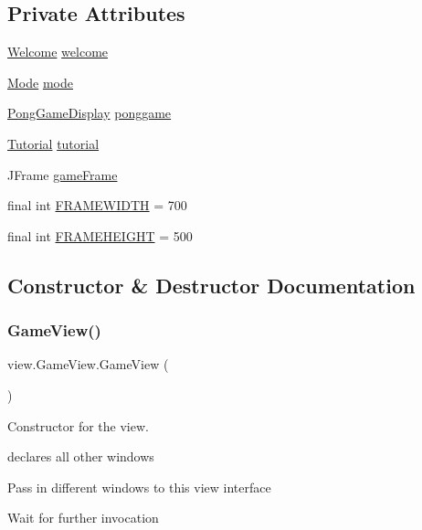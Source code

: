 \subsection*{Private Attributes}
\begin{DoxyCompactItemize}
\item 
\hyperlink{classview_1_1_welcome}{Welcome} \hyperlink{classview_1_1_game_view_a473510516d38bd1b016321b06962f0b0}{welcome}
\item 
\hyperlink{classview_1_1_mode}{Mode} \hyperlink{classview_1_1_game_view_a805dd6b76de78fe934f8c4287b4988ce}{mode}
\item 
\hyperlink{classview_1_1_pong_game_display}{Pong\+Game\+Display} \hyperlink{classview_1_1_game_view_a40ab8540fabeed491fc81dce3e801370}{ponggame}
\item 
\hyperlink{classview_1_1_tutorial}{Tutorial} \hyperlink{classview_1_1_game_view_a6bc586b3b4e3079253f50adb03864264}{tutorial}
\item 
J\+Frame \hyperlink{classview_1_1_game_view_a7e90e32a71e4cbc5356dd2960290917c}{game\+Frame}
\item 
final int \hyperlink{classview_1_1_game_view_a2ab92f79dc374ff6708c7798697b623a}{F\+R\+A\+M\+E\+W\+I\+D\+TH} = 700
\item 
final int \hyperlink{classview_1_1_game_view_a4883525ad5307e9ac642854eb6db66d1}{F\+R\+A\+M\+E\+H\+E\+I\+G\+HT} = 500
\end{DoxyCompactItemize}


\subsection{Constructor \& Destructor Documentation}
\hypertarget{classview_1_1_game_view_a2405d94a94b047f1858e0ac712983b66}{}\label{classview_1_1_game_view_a2405d94a94b047f1858e0ac712983b66} 
\subsubsection{\texorpdfstring{Game\+View()}{GameView()}}
{\footnotesize\ttfamily view.\+Game\+View.\+Game\+View (\begin{DoxyParamCaption}{ }\end{DoxyParamCaption})}



Constructor for the view. 

declares all other windows 
\begin{DoxyItemize}
\item Pass in different windows to this view interface
\item Wait for further invocation
\end{DoxyItemize}

